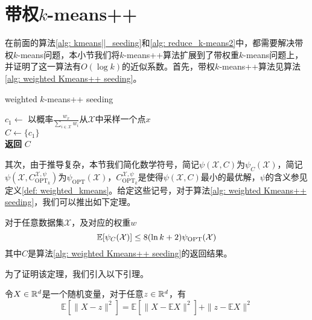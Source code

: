 \section{带权\texorpdfstring{$k$}{k}-means++}
在前面的算法\ref{alg: kmeans||_seeding}和\ref{alg: reduce_k-means2}中，都需要解决带权$k$-means问题，本小节我们将$k$-means++算法扩展到了带权重$k$-means问题上，并证明了这一算法有$O(\log k)$的近似系数。首先，带权$k$-means++算法见算法\ref{alg: weighted Kmeans++ seeding}。
\begin{algorithm}
    \caption{weighted $k$-means++ seeding}\label{alg: weighted Kmeans++ seeding}
    $c_1 \gets $ 以概率$\frac{w_x}{\sum_{i \in \mathcal{X}} w_i}$从$\mathcal{X}$中采样一个点$x$ \\
    $C \gets \{c_1\}$ \\
    \textbf{返回} $C$
\end{algorithm}
其次，由于推导复杂，本节我们简化数学符号，简记$\psi(\mathcal{X},C)$为$\psi_{C}(\mathcal{X})$，简记$\psi(\mathcal{X},C_{\text{OPT}_k}^{\mathcal{X},\psi})$为$\psi_{\text{OPT}}(\mathcal{X})$，$C_{\text{OPT}_k}^{\mathcal{X},\psi}$是使得$\psi(\mathcal{X},C)$最小的最优解，$\psi$的含义参见定义\ref{def: weighted_kmeans}。给定这些记号，对于算法\ref{alg: weighted Kmeans++ seeding}，我们可以推出如下定理。
\begin{theorem}
    \label{theo: weighted kmeans++}
    对于任意数据集$\mathcal{X}$，及对应的权重$w$
    \begin{equation}
        \mathbb{E}[\psi_C(\mathcal{X})] \leq 8(\ln k + 2) \psi_\text{OPT}(\mathcal{X})
    \end{equation}
    其中$C$是算法\ref{alg: weighted Kmeans++ seeding}的返回结果。
\end{theorem}
为了证明该定理，我们引入以下引理。
\begin{lemma}
    \label{lem: expectation}
    令$X\in \mathbb{R}^d$是一个随机变量，对于任意$z \in \mathbb{R}^d$，有
    \begin{equation}
        \label{eq: expectation1}
        \mathbb{E}[\|X-z\|^{2}]=\mathbb{E}[\|X-\mathbb{E} X\|^{2}]+\|z-\mathbb{E} X\|^{2}
    \end{equation}
\end{lemma}
